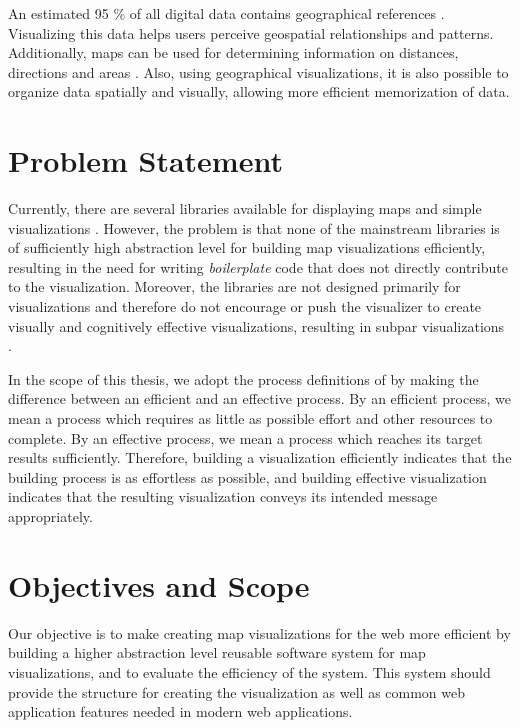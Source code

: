 An estimated 95 \% of all digital data contains geographical references \citep{perkins_have_2010}. Visualizing this data helps users perceive geospatial relationships and patterns. Additionally, maps can be used for determining information on distances, directions and areas \citep[chap.~1.1]{kraak_cartography_2011}. Also, using geographical visualizations, it is also possible to organize data spatially and visually, allowing more efficient memorization of data.

\section{Problem Statement}

Currently, there are several libraries available for displaying maps and simple visualizations \citep{google_maps_2005,agafonkin_leaflet_2011,metacarta_openlayers_2006}. However, the problem is that none of the mainstream libraries is of sufficiently high abstraction level for building map visualizations efficiently, resulting in the need for writing \emph{boilerplate} code that does not directly contribute to the visualization. Moreover, the libraries are not designed primarily for visualizations and therefore do not encourage or push the visualizer to create visually and cognitively effective visualizations, resulting in subpar visualizations \citep[chap.~1]{slocum_thematic_2014}.

In the scope of this thesis, we adopt the process definitions of \citet{van_wijk_value_2005} by making the difference between an efficient and an effective process. By an efficient process, we mean a process which requires as little as possible effort and other resources to complete. By an effective process, we mean a process which reaches its target results sufficiently. Therefore, building a visualization efficiently indicates that the building process is as effortless as possible, and building effective visualization indicates that the resulting visualization conveys its intended message appropriately.

\section{Objectives and Scope}

Our objective is to make creating map visualizations for the web more efficient by building a higher abstraction level reusable software system for map visualizations, and to evaluate the efficiency of the system. This system should provide the structure for creating the visualization as well as common web application features needed in modern web applications.


